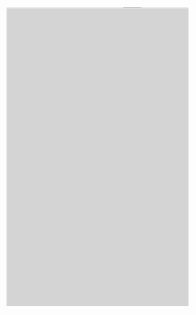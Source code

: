 \documentclass[a4paper,12pt,fleqn,twoside,openany]{book}
\begin{document}
 
% 
% 
% 
% 
% 
  \begin{figure}%
    \centering
    
    ~ %
    \begin{subfigure}{0.2\textwidth}
        \includegraphics[width=\textwidth]{Img/Resultados/Resistencia/EsponjaR.eps}

\end{subfigure}
\end{figure}
\end{document}
